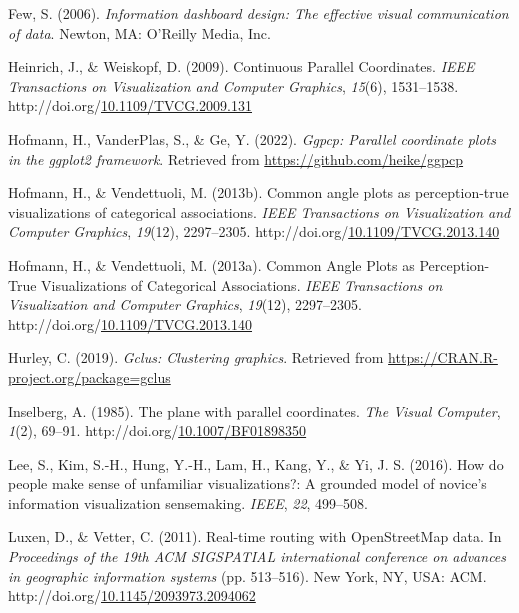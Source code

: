 \documentclass[print]{nuthesis}
\newlength{\cslhangindent}
\newenvironment{CSLReferences}[2]%
{\setlength{\parindent}{0pt}%
\everypar{\setlength{\hangindent}{\cslhangindent}}\ignorespaces}%
{\par}
\begin{document}
\begin{CSLReferences}{1}{0}
\leavevmode\hypertarget{ref-few}{}%
Few, S. (2006). \emph{Information dashboard design: The effective visual communication of data}. Newton, MA: O'Reilly Media, Inc.

\leavevmode\hypertarget{ref-density-pcp}{}%
Heinrich, J., \& Weiskopf, D. (2009). {Continuous Parallel Coordinates}. \emph{IEEE Transactions on Visualization and Computer Graphics}, \emph{15}(6), 1531--1538. http://doi.org/\href{https://doi.org/10.1109/TVCG.2009.131}{10.1109/TVCG.2009.131}

\leavevmode\hypertarget{ref-ggpcp}{}%
Hofmann, H., VanderPlas, S., \& Ge, Y. (2022). \emph{Ggpcp: Parallel coordinate plots in the ggplot2 framework}. Retrieved from \url{https://github.com/heike/ggpcp}

\leavevmode\hypertarget{ref-Heike2013}{}%
Hofmann, H., \& Vendettuoli, M. (2013b). Common angle plots as perception-true visualizations of categorical associations. \emph{IEEE Transactions on Visualization and Computer Graphics}, \emph{19}(12), 2297--2305. http://doi.org/\href{https://doi.org/10.1109/TVCG.2013.140}{10.1109/TVCG.2013.140}

\leavevmode\hypertarget{ref-Hofmann:2013}{}%
Hofmann, H., \& Vendettuoli, M. (2013a). {Common Angle Plots as Perception-True Visualizations of Categorical Associations}. \emph{IEEE Transactions on Visualization and Computer Graphics}, \emph{19}(12), 2297--2305. http://doi.org/\href{https://doi.org/10.1109/TVCG.2013.140}{10.1109/TVCG.2013.140}

\leavevmode\hypertarget{ref-Hurley}{}%
Hurley, C. (2019). \emph{Gclus: Clustering graphics}. Retrieved from \url{https://CRAN.R-project.org/package=gclus}

\leavevmode\hypertarget{ref-Inselberg:1985}{}%
Inselberg, A. (1985). {The plane with parallel coordinates}. \emph{The Visual Computer}, \emph{1}(2), 69--91. http://doi.org/\href{https://doi.org/10.1007/BF01898350}{10.1007/BF01898350}

\leavevmode\hypertarget{ref-lee}{}%
Lee, S., Kim, S.-H., Hung, Y.-H., Lam, H., Kang, Y., \& Yi, J. S. (2016). How do people make sense of unfamiliar visualizations?: A grounded model of novice's information visualization sensemaking. \emph{IEEE}, \emph{22}, 499--508.

\leavevmode\hypertarget{ref-luxen-vetter-2011}{}%
Luxen, D., \& Vetter, C. (2011). Real-time routing with OpenStreetMap data. In \emph{Proceedings of the 19th ACM SIGSPATIAL international conference on advances in geographic information systems} (pp. 513--516). New York, NY, USA: ACM. http://doi.org/\href{https://doi.org/10.1145/2093973.2094062}{10.1145/2093973.2094062}


\end{CSLReferences}
\end{document}
